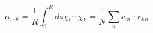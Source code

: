 \begin{equation}
o_{i \cdots k} = \frac{1}{R} \int_0^R d z \chi_i \cdots \chi_k =
\frac{1}{N} \sum_n c_{i n} \cdots c_{k n} \label{overlaps}
\end{equation} 
